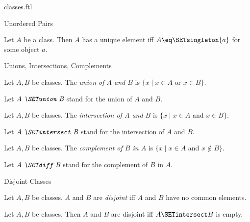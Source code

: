 \documentclass{naproche-library}
\begin{document}
\begin{smodule}[title=Classes]{classes.ftl}
\begin{sfragment}{Unordered Pairs}
  \begin{proposition}[forthel,id=FOUNDATIONS_01_0166348647163481]
    Let $A$ be a class.
    Then $A$ has a unique element iff $A \eq \SETsingleton{a}$ for some object $a$.
  \end{proposition}
\end{sfragment}

\begin{sfragment}{Unions, Intersections, Complements}
  \begin{definition}[forthel,id=FOUNDATIONS_01_2159753924968448]
    Let $A, B$ be classes.
    The \emph{union of $A$ and $B$} is $\{ x \mid x \in A$ or $x \in B \}$.

    Let $\emph{A \SETunion B}$ stand for the union of $A$ and $B$.
  \end{definition}

  \begin{definition}[forthel,id=FOUNDATIONS_01_5744033011859456]
    Let $A, B$ be classes.
    The \emph{intersection of $A$ and $B$} is $\{ x \mid x \in A$ and $x \in B \}$.

    Let $\emph{A \SETintersect B}$ stand for the intersection of $A$ and $B$.
  \end{definition}

  \begin{definition}[forthel,id=FOUNDATIONS_01_7620345041256448]
    Let $A, B$ be classes.
    The \emph{complement of $B$ in $A$} is $\{ x \mid x \in A$ and $x \notin B \}$.

    Let $\emph{A \SETdiff B}$ stand for the complement of $B$ in $A$.
  \end{definition}
\end{sfragment}

\begin{sfragment}{Disjoint Classes}
  \begin{definition}[forthel,id=FOUNDATIONS_01_4981913324355584]
    Let $A, B$ be classes.
    $A$ and $B$ are \emph{disjoint} iff $A$ and $B$ have no common elements.
  \end{definition}

  \begin{proposition}[forthel,id=FOUNDATIONS_01_1211191546347520]
    Let $A, B$ be classes.
    Then $A$ and $B$ are disjoint iff $A \SETintersect B$ is empty.
  \end{proposition}
\end{sfragment}
\end{smodule}
\end{document}
